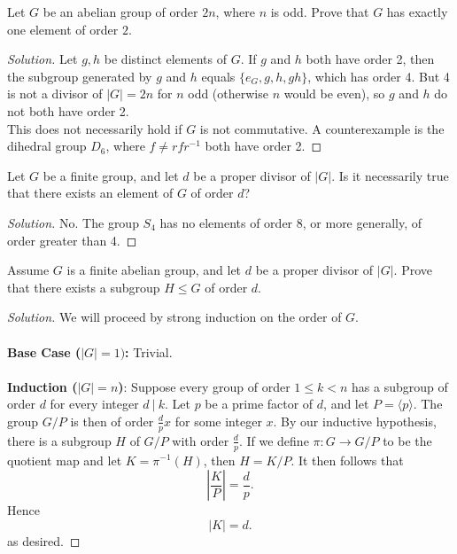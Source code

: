 \documentclass[12pt]{article}
\newenvironment{problem}[2][Problem]{\begin{trivlist}
\item[\hskip \labelsep {\bfseries #1}\hskip \labelsep {\bfseries #2.}]}{\end{trivlist}}
\newenvironment{solution}
  {\renewcommand\qedsymbol{$\blacksquare$}\begin{proof}[Solution]}
{\end{proof}}
\theoremstyle{remark}
\begin{document}
\begin{problem}{8.18}
  Let $G$ be an abelian group of order $2n$, where $n$ is odd.
  Prove that $G$ has exactly one element of order $2$.
\end{problem}
\begin{solution}
  Let $g,h$ be distinct elements of $G$. 
  If $g$ and $h$ both have order 2, then the subgroup generated by $g$ and $h$ 
  equals $\{e_G,g,h,gh\}$, which has order 4.
  But 4 is not a divisor of $|G|=2n$ for $n$ odd (otherwise $n$ would be even), so $g$ and $h$ do not both have
  order 2. \\
  This does not necessarily hold if $G$ is not commutative. 
  A counterexample is the dihedral group $D_6$, where $f\neq rfr^{-1}$ both have order 2.
\end{solution}
\begin{problem}{8.19}
  Let $G$ be a finite group, and let $d$ be a proper divisor of $|G|$.
  Is it necessarily true that there exists an element of $G$ of order $d$?
\end{problem}
\begin{solution}
  No.
  The group $S_4$ has no elements of order 8, or more generally, of order greater than 4.
\end{solution}
\begin{problem}{8.20}
  Assume $G$ is a finite abelian group, and let $d$ be a proper divisor of $|G|$.
  Prove that there exists a subgroup $H\leq G$ of order $d$.
\end{problem}
\begin{solution}
  We will proceed by strong induction on the order of $G$. \\\\
  \textbf{Base Case ($|G|=1)$:} Trivial.\\\\
  \textbf{Induction ($|G|=n$)}: 
  Suppose every group of order $1\leq k<n$ has a subgroup of order $d$ for every integer $d~|~k$.
  Let $p$ be a prime factor of $d$, and let $P=\langle p\rangle$.
  The group $G/P$ is then of order $\frac{d}{p}x$ for some integer $x$.
  By our inductive hypothesis, there is a subgroup $H$ of $G/P$ with order $\frac{d}{p}$.
  If we define $\pi : G\to G/P$ to be the quotient map and let $K=\pi^{-1}(H)$, then $H=K/P$.
  It then follows that
  \begin{equation*}
    \left|\frac{K}{P}\right| = \frac{d}{p}.
  \end{equation*}
  Hence 
  \begin{equation*}
    |K|=d.
  \end{equation*}
  as desired.
\end{solution}
\end{document}
